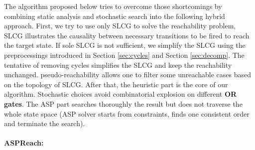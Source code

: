 The algorithm proposed below tries to overcome those shortcomings by combining static analysis and stochastic search into the following hybrid approach.
First, we try to use only SLCG to solve the reachability problem, SLCG illustrates the causality between necessary transitions to be fired to reach the target state.
If sole SLCG is not sufficient, we simplify the SLCG using the preprocessings introduced in Section \ref{sec:cycles} and Section \ref{sec:decomp}. 
The tentative of removing cycles simplifies the SLCG and keep the reachability unchanged. 
pseudo-reachability allows one to filter some unreachable cases based on the topology of SLCG. 
After that, the heuristic part is the core of our algorithm.
Stochastic choices avoid combinatorial explosion on different \textbf{OR gates}.
The ASP part searches thoroughly the result but does not traverse the whole state space (ASP solver starts from constraints, finds one consistent order and terminate the search). 

\paragraph{{\bf ASPReach}:}


